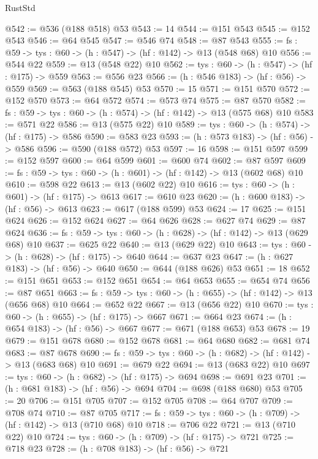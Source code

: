 \begin{lexlean}{RustStd}
\begin{coremodule}
@542 := @536 (@188 @518) @53
@543 := 14
@544 := @151 @543
@545 := @152 @543
@546 := @64 @545
@547 := @546 @74
@548 := @87 @543
@555 := {fs : @59} -> {tys : @60} -> (h : @547) -> (hf : @142) -> @13 (@548 @68) @10
@556 := @544 @22
@559 := @13 (@548 @22) @10
@562 := {tys : @60} -> (h : @547) -> (hf : @175) -> @559
@563 := @556 @23
@566 := (h : @546 @183) -> (hf : @56) -> @559
@569 := @563 (@188 @545) @53
@570 := 15
@571 := @151 @570
@572 := @152 @570
@573 := @64 @572
@574 := @573 @74
@575 := @87 @570
@582 := {fs : @59} -> {tys : @60} -> (h : @574) -> (hf : @142) -> @13 (@575 @68) @10
@583 := @571 @22
@586 := @13 (@575 @22) @10
@589 := {tys : @60} -> (h : @574) -> (hf : @175) -> @586
@590 := @583 @23
@593 := (h : @573 @183) -> (hf : @56) -> @586
@596 := @590 (@188 @572) @53
@597 := 16
@598 := @151 @597
@599 := @152 @597
@600 := @64 @599
@601 := @600 @74
@602 := @87 @597
@609 := {fs : @59} -> {tys : @60} -> (h : @601) -> (hf : @142) -> @13 (@602 @68) @10
@610 := @598 @22
@613 := @13 (@602 @22) @10
@616 := {tys : @60} -> (h : @601) -> (hf : @175) -> @613
@617 := @610 @23
@620 := (h : @600 @183) -> (hf : @56) -> @613
@623 := @617 (@188 @599) @53
@624 := 17
@625 := @151 @624
@626 := @152 @624
@627 := @64 @626
@628 := @627 @74
@629 := @87 @624
@636 := {fs : @59} -> {tys : @60} -> (h : @628) -> (hf : @142) -> @13 (@629 @68) @10
@637 := @625 @22
@640 := @13 (@629 @22) @10
@643 := {tys : @60} -> (h : @628) -> (hf : @175) -> @640
@644 := @637 @23
@647 := (h : @627 @183) -> (hf : @56) -> @640
@650 := @644 (@188 @626) @53
@651 := 18
@652 := @151 @651
@653 := @152 @651
@654 := @64 @653
@655 := @654 @74
@656 := @87 @651
@663 := {fs : @59} -> {tys : @60} -> (h : @655) -> (hf : @142) -> @13 (@656 @68) @10
@664 := @652 @22
@667 := @13 (@656 @22) @10
@670 := {tys : @60} -> (h : @655) -> (hf : @175) -> @667
@671 := @664 @23
@674 := (h : @654 @183) -> (hf : @56) -> @667
@677 := @671 (@188 @653) @53
@678 := 19
@679 := @151 @678
@680 := @152 @678
@681 := @64 @680
@682 := @681 @74
@683 := @87 @678
@690 := {fs : @59} -> {tys : @60} -> (h : @682) -> (hf : @142) -> @13 (@683 @68) @10
@691 := @679 @22
@694 := @13 (@683 @22) @10
@697 := {tys : @60} -> (h : @682) -> (hf : @175) -> @694
@698 := @691 @23
@701 := (h : @681 @183) -> (hf : @56) -> @694
@704 := @698 (@188 @680) @53
@705 := 20
@706 := @151 @705
@707 := @152 @705
@708 := @64 @707
@709 := @708 @74
@710 := @87 @705
@717 := {fs : @59} -> {tys : @60} -> (h : @709) -> (hf : @142) -> @13 (@710 @68) @10
@718 := @706 @22
@721 := @13 (@710 @22) @10
@724 := {tys : @60} -> (h : @709) -> (hf : @175) -> @721
@725 := @718 @23
@728 := (h : @708 @183) -> (hf : @56) -> @721

\end{coremodule}
\end{lexlean}
